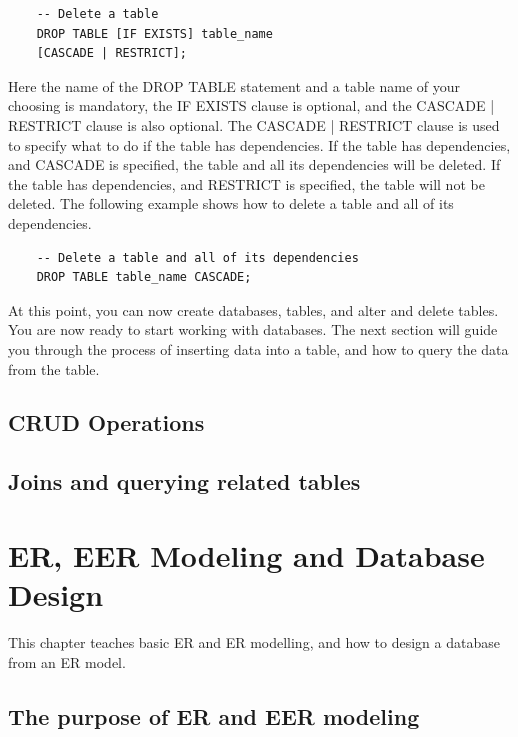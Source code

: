 \begin{verbatim}
    -- Delete a table
    DROP TABLE [IF EXISTS] table_name 
    [CASCADE | RESTRICT];
\end{verbatim}

Here the name of the DROP TABLE statement and a table name of your choosing is mandatory, the IF EXISTS clause is optional, and the CASCADE | RESTRICT clause is also optional. The CASCADE | RESTRICT clause is used to specify what to do if the table has dependencies. If the table has dependencies, and CASCADE is specified, the table and all its dependencies will be deleted. If the table has dependencies, and RESTRICT is specified, the table will not be deleted. The following example shows how to delete a table and all of its dependencies.

\begin{verbatim}
    -- Delete a table and all of its dependencies
    DROP TABLE table_name CASCADE;
\end{verbatim}

At this point, you can now create databases, tables, and alter and delete tables. You are now ready to start working with databases. The next section will guide you through the process of inserting data into a table, and how to query the data from the table.

\section{CRUD Operations}

\section{Joins and querying related tables}

\chapter{ER, EER Modeling and Database Design}
\label{chap:relational:eer-modeling-and-database-design}
This chapter teaches basic ER and ER modelling, and how to design a database from an ER model.

\section{The purpose of ER and EER modeling}
